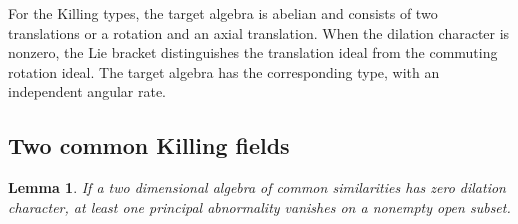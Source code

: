 \documentclass[11pt,a4paper]{article}
\numberwithin{equation}{section}
\theoremstyle{plain}
\newtheorem{lemma}[theorem]{Lemma}
\theoremstyle{definition}
\theoremstyle{remark}
\begin{document}
For the Killing types, the target algebra is abelian and consists of
two translations or a rotation and an axial translation. When the
dilation character is nonzero, the Lie bracket distinguishes the
translation ideal from the commuting rotation ideal. The target
algebra has the corresponding type, with an independent angular rate.

\subsection{Two common Killing fields}

\begin{lemma}\label{fnd:two-killing-generators}
If a two dimensional algebra of common similarities has zero dilation
character, at least one principal abnormality vanishes on a nonempty
open subset.
\end{lemma}
\end{document}
